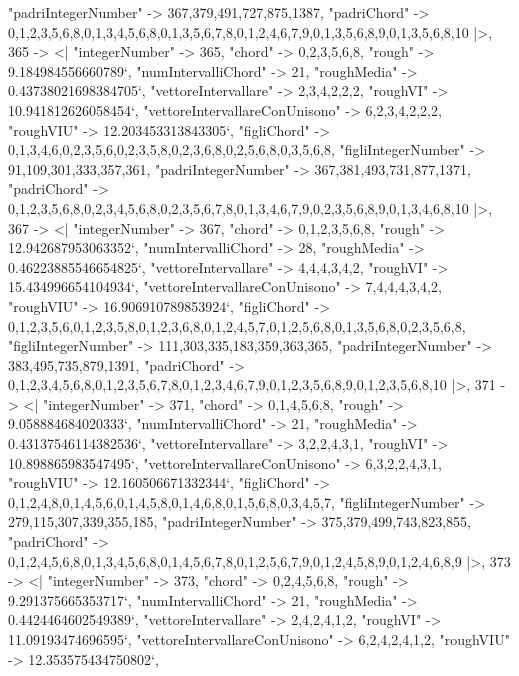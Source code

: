 \documentclass[
]{article}
\begin{document}
\begin{DatasetVerbatim}
    "padriIntegerNumber" -> {367,379,491,727,875,1387},
    "padriChord" -> {{0,1,2,3,5,6,8},{0,1,3,4,5,6,8},{0,1,3,5,6,7,8},{0,1,2,4,6,7,9},{0,1,3,5,6,8,9},{0,1,3,5,6,8,10}}
  |>,
  365 -> <|
    "integerNumber" -> 365,
    "chord" -> {0,2,3,5,6,8},
    "rough" -> 9.184984556660789`,
    "numIntervalliChord" -> 21,
    "roughMedia" -> 0.43738021698384705`,
    "vettoreIntervallare" -> {2,3,4,2,2,2},
    "roughVI" -> 10.941812626058454`,
    "vettoreIntervallareConUnisono" -> {6,2,3,4,2,2,2},
    "roughVIU" -> 12.203453313843305`,
    "figliChord" -> {{0,1,3,4,6},{0,2,3,5,6},{0,2,3,5,8},{0,2,3,6,8},{0,2,5,6,8},{0,3,5,6,8}},
    "figliIntegerNumber" -> {91,109,301,333,357,361},
    "padriIntegerNumber" -> {367,381,493,731,877,1371},
    "padriChord" -> {{0,1,2,3,5,6,8},{0,2,3,4,5,6,8},{0,2,3,5,6,7,8},{0,1,3,4,6,7,9},{0,2,3,5,6,8,9},{0,1,3,4,6,8,10}}
  |>,
  367 -> <|
    "integerNumber" -> 367,
    "chord" -> {0,1,2,3,5,6,8},
    "rough" -> 12.942687953063352`,
    "numIntervalliChord" -> 28,
    "roughMedia" -> 0.46223885546654825`,
    "vettoreIntervallare" -> {4,4,4,3,4,2},
    "roughVI" -> 15.434996654104934`,
    "vettoreIntervallareConUnisono" -> {7,4,4,4,3,4,2},
    "roughVIU" -> 16.906910789853924`,
    "figliChord" -> {{0,1,2,3,5,6},{0,1,2,3,5,8},{0,1,2,3,6,8},{0,1,2,4,5,7},{0,1,2,5,6,8},{0,1,3,5,6,8},{0,2,3,5,6,8}},
    "figliIntegerNumber" -> {111,303,335,183,359,363,365},
    "padriIntegerNumber" -> {383,495,735,879,1391},
    "padriChord" -> {{0,1,2,3,4,5,6,8},{0,1,2,3,5,6,7,8},{0,1,2,3,4,6,7,9},{0,1,2,3,5,6,8,9},{0,1,2,3,5,6,8,10}}
  |>,
  371 -> <|
    "integerNumber" -> 371,
    "chord" -> {0,1,4,5,6,8},
    "rough" -> 9.058884684020333`,
    "numIntervalliChord" -> 21,
    "roughMedia" -> 0.43137546114382536`,
    "vettoreIntervallare" -> {3,2,2,4,3,1},
    "roughVI" -> 10.898865983547495`,
    "vettoreIntervallareConUnisono" -> {6,3,2,2,4,3,1},
    "roughVIU" -> 12.160506671332344`,
    "figliChord" -> {{0,1,2,4,8},{0,1,4,5,6},{0,1,4,5,8},{0,1,4,6,8},{0,1,5,6,8},{0,3,4,5,7}},
    "figliIntegerNumber" -> {279,115,307,339,355,185},
    "padriIntegerNumber" -> {375,379,499,743,823,855},
    "padriChord" -> {{0,1,2,4,5,6,8},{0,1,3,4,5,6,8},{0,1,4,5,6,7,8},{0,1,2,5,6,7,9},{0,1,2,4,5,8,9},{0,1,2,4,6,8,9}}
  |>,
  373 -> <|
    "integerNumber" -> 373,
    "chord" -> {0,2,4,5,6,8},
    "rough" -> 9.291375665353717`,
    "numIntervalliChord" -> 21,
    "roughMedia" -> 0.4424464602549389`,
    "vettoreIntervallare" -> {2,4,2,4,1,2},
    "roughVI" -> 11.09193474696595`,
    "vettoreIntervallareConUnisono" -> {6,2,4,2,4,1,2},
    "roughVIU" -> 12.353575434750802`,

\end{DatasetVerbatim}
\end{document}
